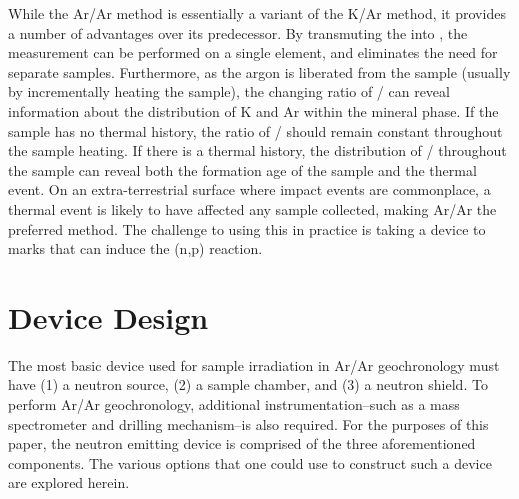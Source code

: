 \documentclass{mc2015}
\begin{document}
While the Ar/Ar method is essentially a variant of the K/Ar method, it provides a number of advantages over its predecessor. By transmuting the  into , the measurement can be performed on a single element, and eliminates the need for separate samples. Furthermore, as the argon is liberated from the sample (usually by incrementally heating the sample), the changing ratio of / can reveal information about the distribution of K and Ar within the mineral phase. If the sample has no thermal history, the ratio of / should remain constant throughout the sample heating. If there is a thermal history, the distribution of / throughout the sample can reveal both the formation age of the sample and the thermal event. On an extra-terrestrial surface where impact events are commonplace, a thermal event is likely to have affected any sample collected, making Ar/Ar the preferred method. The challenge to using this in practice is taking a device to marks that can induce the (n,p) reaction.

\section{Device Design}
\label{sec:design}

The most basic device used for sample irradiation in Ar/Ar geochronology must have (1) a neutron source, (2) a sample chamber, and (3) a neutron shield. To perform Ar/Ar geochronology, additional instrumentation--such as a mass spectrometer and drilling mechanism--is also required. For the purposes of this paper, the neutron emitting device is comprised of the three aforementioned components. The various options that one could use to construct such a device are explored herein. 
\end{document}
